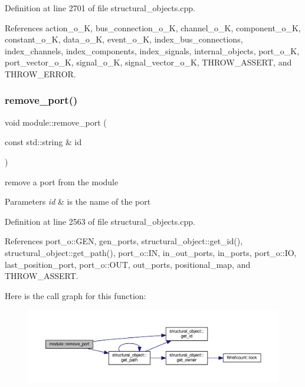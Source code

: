 Definition at line 2701 of file structural\+\_\+objects.\+cpp.



References action\+\_\+o\+\_\+K, bus\+\_\+connection\+\_\+o\+\_\+K, channel\+\_\+o\+\_\+K, component\+\_\+o\+\_\+K, constant\+\_\+o\+\_\+K, data\+\_\+o\+\_\+K, event\+\_\+o\+\_\+K, index\+\_\+bus\+\_\+connections, index\+\_\+channels, index\+\_\+components, index\+\_\+signals, internal\+\_\+objects, port\+\_\+o\+\_\+K, port\+\_\+vector\+\_\+o\+\_\+K, signal\+\_\+o\+\_\+K, signal\+\_\+vector\+\_\+o\+\_\+K, T\+H\+R\+O\+W\+\_\+\+A\+S\+S\+E\+RT, and T\+H\+R\+O\+W\+\_\+\+E\+R\+R\+OR.

\mbox{\label{classmodule_af90fb820c14a242b9013852a3f18867a}} 
\subsubsection{\texorpdfstring{remove\+\_\+port()}{remove\_port()}}
{\footnotesize\ttfamily void module\+::remove\+\_\+port (\begin{DoxyParamCaption}\item[{const std\+::string \&}]{id }\end{DoxyParamCaption})}



remove a port from the module 


\begin{DoxyParams}{Parameters}
{\em id} & is the name of the port \\
\hline
\end{DoxyParams}


Definition at line 2563 of file structural\+\_\+objects.\+cpp.



References port\+\_\+o\+::\+G\+EN, gen\+\_\+ports, structural\+\_\+object\+::get\+\_\+id(), structural\+\_\+object\+::get\+\_\+path(), port\+\_\+o\+::\+IN, in\+\_\+out\+\_\+ports, in\+\_\+ports, port\+\_\+o\+::\+IO, last\+\_\+position\+\_\+port, port\+\_\+o\+::\+O\+UT, out\+\_\+ports, positional\+\_\+map, and T\+H\+R\+O\+W\+\_\+\+A\+S\+S\+E\+RT.

Here is the call graph for this function\+:
\nopagebreak
\begin{figure}[H]
\begin{center}
\leavevmode
\includegraphics[width=350pt]{d0/dd3/classmodule_af90fb820c14a242b9013852a3f18867a_cgraph}
\end{center}
\end{figure}
\mbox{\label{classmodule_a765b2eebf434191d207faa31dac7ea57}} 
